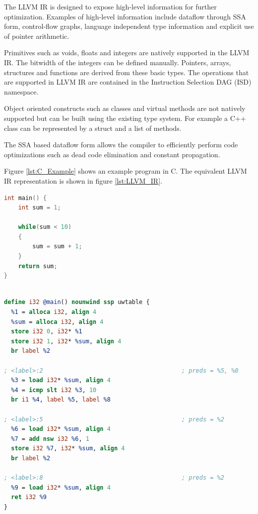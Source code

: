 The LLVM IR is designed to expose high-level information for further optimization. Examples of high-level information include dataflow through SSA form, control-flow graphs, language independent type information and explicit use of pointer arithmetic. 

Primitives such as voids, floats and integers are natively supported in the LLVM IR. The bitwidth of the integers can be defined manually. Pointers, arrays, structures and functions are derived from these basic types. The operations that are supported in LLVM IR are contained in the Instruction Selection DAG (ISD) namespace.

Object oriented constructs such as classes and virtual methods are not natively supported but can be built using the existing type system. For example a C++ class can be represented by a struct and a list of methods. 

The SSA based dataflow form allows the compiler to efficiently perform code optimizations such as dead code elimination and constant propagation. 

Figure \ref{lst:C_Example} shows an example program in C. The equivalent LLVM IR representation is shown in figure \ref{lst:LLVM_IR}.

\lstset{numbers=none, captionpos=b}
\begin{lstlisting}[language=C,caption={C example program},label=lst:C_Example]
int main() {
	int sum = 1;

	while(sum < 10)
	{
		sum = sum + 1;
	}
	return sum;
}
\end{lstlisting}


\lstset{numbers=none, captionpos=b}
\begin{lstlisting}[language=llvm,caption={LLVM Intermediate representation},label=lst:LLVM_IR]

define i32 @main() nounwind ssp uwtable {
  %1 = alloca i32, align 4
  %sum = alloca i32, align 4
  store i32 0, i32* %1
  store i32 1, i32* %sum, align 4
  br label %2

; <label>:2                                       ; preds = %5, %0
  %3 = load i32* %sum, align 4
  %4 = icmp slt i32 %3, 10
  br i1 %4, label %5, label %8

; <label>:5                                       ; preds = %2
  %6 = load i32* %sum, align 4
  %7 = add nsw i32 %6, 1
  store i32 %7, i32* %sum, align 4
  br label %2

; <label>:8                                       ; preds = %2
  %9 = load i32* %sum, align 4
  ret i32 %9
}

\end{lstlisting}

